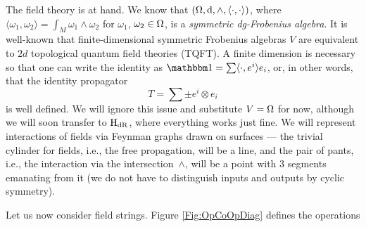 \documentclass[\MainFolder/Text.tex]{subfiles}
\begin{document}
The field theory is at hand.
We know that $(\Omega,\mathrm{d},\wedge,\langle\cdot,\cdot\rangle)$, where $\langle\omega_1,\omega_2\rangle = \int_M \omega_1 \wedge \omega_2$ for $\omega_1$, $\omega_2\in \Omega$, is a \emph{symmetric dg-Frobenius algebra}.
It is well-known that finite-dimensional symmetric Frobenius algebras $V$ are equivalent to $2d$ topological quantum field theories (TQFT).
A finite dimension is necessary so that one can write the identity as $\Id = \sum \langle \cdot,e^i\rangle e_i$, or, in other words, that the identity propagator 
\[
T = \sum \pm e^i\otimes e_i
\]
is well defined.
We will ignore this issue and substitute $V=\Omega$ for now, although we will soon transfer to $\mathrm{H}_{\mathrm{dR}}$, where everything works just fine.
We will represent interactions of fields via Feynman graphs drawn on surfaces --- the trivial cylinder for fields, i.e., the free propagation, will be a line, and the pair of pants, i.e., the interaction via the intersection~$\wedge$, will be a point with $3$ segments emanating from it (we do not have to distinguish inputs and outputs by cyclic symmetry).

Let us now consider field strings. Figure \ref{Fig:OpCoOpDiag} defines the operations
\end{document}
